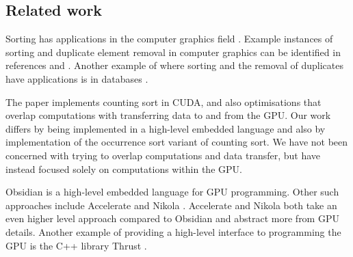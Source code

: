 \subsection{Related work} 

Sorting has applications in the computer graphics field \cite{sintorn}. 
Example instances of sorting and duplicate element removal in computer graphics 
can be identified in references \cite{Olsson} and \cite{Karras}. Another example 
of where sorting and the removal of duplicates have applications is 
in databases \cite{REMOVEDUPS}. 


The paper \cite{CSORT} implements counting sort in CUDA, and also optimisations 
that overlap computations with transferring data to and from the GPU.
Our work differs by being implemented in a high-level embedded
language and also by implementation of the occurrence sort variant of counting sort. We have not been concerned with
trying to overlap computations and data transfer, but have instead
focused solely on computations within the GPU.

Obsidian is a high-level embedded language for GPU
programming. Other such approaches include Accelerate
\cite{Acc} and Nikola \cite{NIKOLA}. Accelerate and Nikola both take an even
higher level approach compared to Obsidian and abstract more from GPU
details. Another example of providing a high-level interface to
programming the GPU is the C++ library Thrust \cite{THRUST}.



